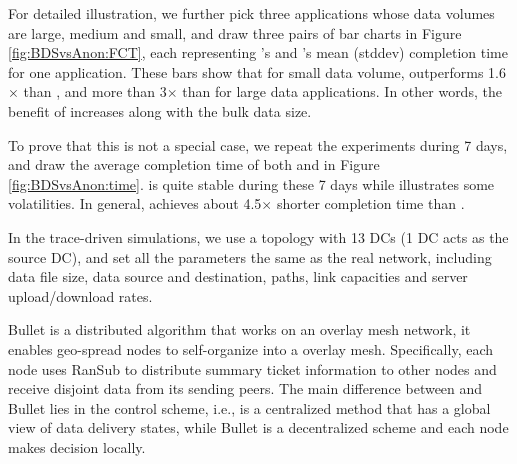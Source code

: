 For detailed illustration, we further pick three applications whose data volumes are large, medium and small, and draw three pairs of bar charts in Figure \ref{fig:BDSvsAnon:FCT}, each representing \name's and \company's mean (stddev) completion time for one application. These bars show that for small data volume, \name outperforms 1.6$\times$ than \company, and more than 3$\times$ than \company for large data applications. In other words, the benefit of \name increases along with the bulk data size.

To prove that this is not a special case, we repeat the experiments during 7 days, and draw the average completion time of both \name and \company in Figure \ref{fig:BDSvsAnon:time}. \name is quite stable during these 7 days while \company illustrates some volatilities. In general, \name achieves about 4.5$\times$ shorter completion time than \company.



In the trace-driven simulations, we use a topology with 13 DCs (1 DC acts as the source DC), and set all the parameters the same as the real network, including data file size, data source and destination, paths, link capacities and server upload/download rates.

Bullet \cite{kostic2003bullet} is a distributed algorithm that works on an overlay mesh network, it enables geo-spread nodes to self-organize into a overlay mesh. Specifically, each node uses RanSub \cite{Rodriguez2003Using} to distribute summary ticket information to other nodes and receive disjoint data from its sending peers. The main difference between \name and Bullet lies in the control scheme, i.e., \name is a centralized method that has a global view of data delivery states, while Bullet is a decentralized scheme and each node makes decision locally.

